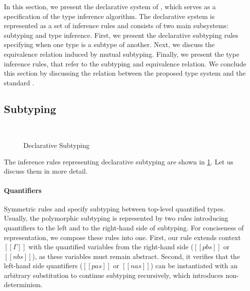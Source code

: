 \label{sec:declarative-system}

In this section, we present the declarative system of \fexists,
which serves as a specification of the type inference algorithm.
The declarative system is represented as a set of inference rules
and consists of two main subsystems: subtyping and type inference.
First, we present the declarative subtyping rules specifying 
when one type is a subtype of another. Next, we discuss 
the equivalence relation induced by mutual subtyping.
Finally, we present the type inference rules,
that refer to the subtyping and equivalence relation.
We conclude this section by discussing the relation between the
proposed type system and the standard \systemf.

\subsection{Subtyping}

\begin{figure}
  \begin{minipage}[t]{0.49\textwidth}
    \ottdefnDOneNsubLabeled{}
  \end{minipage}%
  \begin{minipage}[t]{0.49\textwidth}
    \ottdefnDOnePsupLabeled{}
  \end{minipage}
  \hfill\\
  \begin{minipage}[t]{0.49\textwidth}
    \ottdefnDOneNeqLabeled{}
  \end{minipage}%
  \begin{minipage}[t]{0.49\textwidth}
    \ottdefnDOnePeqLabeled{}
  \end{minipage}
  \caption{Declarative Subtyping}
  \label{fig:declarative-subtyping}
\end{figure}

The inference rules representing declarative subtyping are shown in
\cref{fig:declarative-subtyping}. Let us discuss them in more detail.

\paragraph*{Quantifiers}  
Symmetric rules  and 
 specify 
subtyping between top-level quantified types.
Usually, the polymorphic subtyping is represented by two rules
introducing quantifiers to the left and to the right-hand side of subtyping.
For conciseness of representation, we compose these rules into one.
First, our rule extends context $[[Γ]]$ with the quantified variables 
from the right-hand side ($[[pbs]]$ or $[[nbs]]$), 
as these variables must remain abstract.
Second, it verifies that the left-hand side quantifiers
($[[pas]]$ or $[[nas]]$) can be instantiated 
with an arbitrary substitution to continue subtyping recursively,
which introduces non-determinism. 

